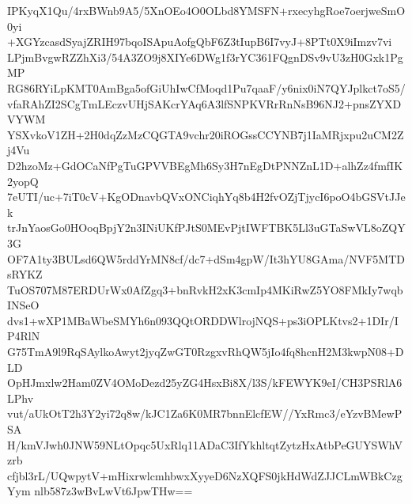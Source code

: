 IPKyqX1Qu/4rxBWnb9A5/5XnOEo4O0OLbd8YMSFN+rxecyhgRoe7oerjweSmO0yi
+XGYzcasdSyajZRIH97bqoISApuAofgQbF6Z3tIupB6I7vyJ+8PTt0X9iImzv7vi
LPjmBvgwRZZhXi3/54A3ZO9j8XIYe6DWg1f3rYC361FQgnDSv9vU3zH0Gxk1PgMP
RG86RYiLpKMT0AmBga5ofGiUhIwCfMoqd1Pu7qaaF/y6nix0iN7QYJplkct7oS5/
vfaRAhZI2SCgTmLEczvUHjSAKcrYAq6A3lfSNPKVRrRnNsB96NJ2+pnsZYXDVYWM
YSXvkoV1ZH+2H0dqZzMzCQGTA9vchr20iROGssCCYNB7j1IaMRjxpu2uCM2Zj4Vu
D2hzoMz+GdOCaNfPgTuGPVVBEgMh6Sy3H7nEgDtPNNZnL1D+alhZz4fmfIK2yopQ
7eUTI/uc+7iT0cV+KgODnavbQVxONCiqhYq8b4H2fvOZjTjycI6poO4bGSVtJJek
trJnYaosGo0HOoqBpjY2n3INiUKfPJtS0MEvPjtIWFTBK5Ll3uGTaSwVL8oZQY3G
OF7A1ty3BULsd6QW5rddYrMN8cf/dc7+dSm4gpW/It3hYU8GAma/NVF5MTDsRYKZ
TuOS707M87ERDUrWx0AfZgq3+bnRvkH2xK3cmIp4MKiRwZ5YO8FMkIy7wqbINSeO
dvs1+wXP1MBaWbeSMYh6n093QQtORDDWlrojNQS+ps3iOPLKtvs2+1DIr/IP4RlN
G75TmA9l9RqSAylkoAwyt2jyqZwGT0RzgxvRhQW5jIo4fq8hcnH2M3kwpN08+DLD
OpHJmxlw2Ham0ZV4OMoDezd25yZG4HsxBi8X/l3S/kFEWYK9eI/CH3PSRlA6LPhv
vut/aUkOtT2h3Y2yi72q8w/kJC1Za6K0MR7bnnElcfEW//YxRmc3/eYzvBMewPSA
H/kmVJwh0JNW59NLtOpqc5UxRlq11ADaC3IfYkhltqtZytzHxAtbPeGUYSWhVzrb
cfjbl3rL/UQwpytV+mHixrwlcmhbwxXyyeD6NzXQFS0jkHdWdZJJCLmWBkCzgYym
nlb587z3wBvLwVt6JpwTHw==
